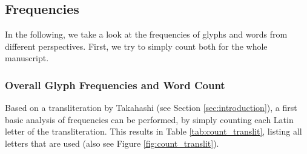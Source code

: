 \documentclass{scrarticle}
\begin{document}
\subsection{Frequencies}\label{sec:frequencies}
In the following, we take a look at the frequencies of glyphs and words from different perspectives. First, we try to simply count both for the whole manuscript.


\subsubsection{Overall Glyph Frequencies and Word Count}\label{sec:frequencies_overall}
Based on a transliteration by Takahashi (see Section \ref{sec:introduction}), a first basic analysis of frequencies can be performed, by simply counting each Latin letter of the transliteration.
This results in Table \ref{tab:count_translit}, listing all letters that are used (also see Figure \ref{fig:count_translit}).
\end{document}
